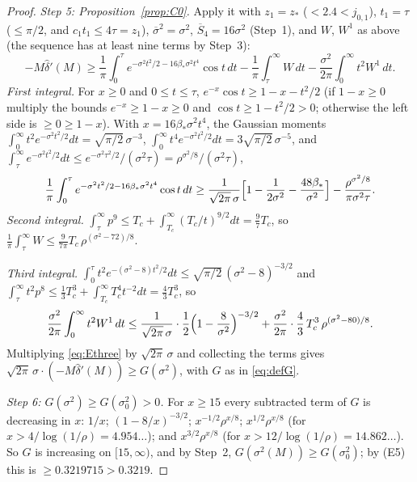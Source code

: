 \documentclass[11pt]{amsart}
\theoremstyle{definition}
\numberwithin{equation}{section}
\newcommand{\hd}{\widehat\delta}
\begin{document}
\begin{proof}
\emph{Step 5: Proposition~\ref{prop:C0}.} Apply it with $z_1=z_*$
($<2.4<j_{0,1}$), $t_1=\tau$ ($\le\pi/2$, and $c_1t_1\le4\tau=z_1$),
$\overline{\sigma}^2=\sigma^2$, $\overline S_4=16\sigma^2$ (Step~1),
and $W$, $W^1$ as above (the sequence has at least nine terms by
Step~3):
\begin{equation}\label{eq:Ethree}
-M\hd'(M)\ge\frac1\pi\int_0^\tau e^{-\sigma^2t^2/2-16\beta_*\sigma^2t^4}\cos t\,dt
-\frac1\pi\int_\tau^\infty W\,dt-\frac{\sigma^2}{2\pi}\int_0^\infty t^2W^1\,dt .
\end{equation}
\emph{First integral.} For $x\ge0$ and $0\le t\le\tau$,
$e^{-x}\cos t\ge1-x-t^2/2$ (if $1-x\ge0$ multiply the bounds
$e^{-x}\ge1-x\ge0$ and $\cos t\ge1-t^2/2>0$; otherwise the left side
is $\ge0\ge1-x$). With $x=16\beta_*\sigma^2t^4$, the Gaussian moments
$\int_0^\infty t^2e^{-\sigma^2t^2/2}dt=\sqrt{\pi/2}\,\sigma^{-3}$,
$\int_0^\infty t^4e^{-\sigma^2t^2/2}dt=3\sqrt{\pi/2}\,\sigma^{-5}$, and
$\int_\tau^\infty e^{-\sigma^2t^2/2}dt\le e^{-\sigma^2\tau^2/2}/(\sigma^2\tau)
=\rho^{\sigma^2/8}/(\sigma^2\tau)$,
\[
\frac1\pi\int_0^\tau e^{-\sigma^2t^2/2-16\beta_*\sigma^2t^4}\cos t\,dt
\ge\frac{1}{\sqrt{2\pi}\,\sigma}\Bigl[1-\frac1{2\sigma^2}-\frac{48\beta_*}{\sigma^2}\Bigr]
-\frac{\rho^{\sigma^2/8}}{\pi\sigma^2\tau}.
\]
\emph{Second integral.} $\int_\tau^\infty p^9\le T_c+\int_{T_c}^\infty(T_c/t)^{9/2}dt
=\frac97T_c$, so
$\frac1\pi\int_\tau^\infty W\le\frac{9}{7\pi}T_c\,\rho^{(\sigma^2-72)/8}$.

\noindent\emph{Third integral.}
$\int_0^\tau t^2e^{-(\sigma^2-8)t^2/2}dt\le\sqrt{\pi/2}\,(\sigma^2-8)^{-3/2}$
and $\int_\tau^\infty t^2p^8\le\frac13T_c^3+\int_{T_c}^\infty T_c^4t^{-2}dt
=\frac43T_c^3$, so
\[
\frac{\sigma^2}{2\pi}\int_0^\infty t^2W^1\,dt\le
\frac{1}{\sqrt{2\pi}\,\sigma}\cdot\frac12\Bigl(1-\frac8{\sigma^2}\Bigr)^{-3/2}
+\frac{\sigma^2}{2\pi}\cdot\frac43\,T_c^3\,\rho^{(\sigma^2-80)/8}.
\]
Multiplying \eqref{eq:Ethree} by $\sqrt{2\pi}\,\sigma$ and collecting
the terms gives $\sqrt{2\pi}\,\sigma\cdot(-M\hd'(M))\ge G(\sigma^2)$,
with $G$ as in \eqref{eq:defG}.

\emph{Step 6: $G(\sigma^2)\ge G(\sigma_0^2)>0$.} For $x\ge15$ every
subtracted term of $G$ is decreasing in $x$: $1/x$;
$(1-8/x)^{-3/2}$; $x^{-1/2}\rho^{x/8}$; $x^{1/2}\rho^{x/8}$ (for
$x>4/\log(1/\rho)=4.954\ldots$); and $x^{3/2}\rho^{x/8}$ (for
$x>12/\log(1/\rho)=14.862\ldots$). So $G$ is increasing on $[15,\infty)$, and
by Step~2, $G(\sigma^2(M))\ge G(\sigma_0^2)$; by (E5) this is
$\ge0.3219715>0.3219$.
\end{proof}
\end{document}
